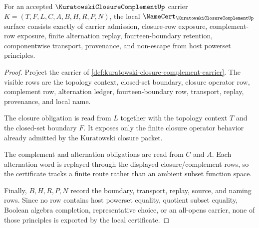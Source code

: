 \begin{theorem}
\label{thm:kuratowski-closure-complement-namecert-obligations}
For an accepted $\KuratowskiClosureComplementUp$ carrier $K=(T,F,L,C,A,B,H,R,P,N)$, the local $\NameCert_{\KuratowskiClosureComplementUp}$ surface consists exactly of carrier admission, closure-row exposure, complement-row exposure, finite alternation replay, fourteen-boundary retention, componentwise transport, provenance, and non-escape from host powerset principles.
\end{theorem}
\begin{proof}
Project the carrier of \autoref{def:kuratowski-closure-complement-carrier}. The visible rows are the topology context, closed-set boundary, closure operator row, complement row, alternation ledger, fourteen-boundary row, transport, replay, provenance, and local name.

The closure obligation is read from $L$ together with the topology context $T$ and the closed-set boundary $F$. It exposes only the finite closure operator behavior already admitted by the Kuratowski closure packet.

The complement and alternation obligations are read from $C$ and $A$. Each alternation word is replayed through the displayed closure/complement rows, so the certificate tracks a finite route rather than an ambient subset function space.

Finally, $B,H,R,P,N$ record the boundary, transport, replay, source, and naming rows. Since no row contains host powerset equality, quotient subset equality, Boolean algebra completion, representative choice, or an all-opens carrier, none of those principles is exported by the local certificate.
\end{proof}

